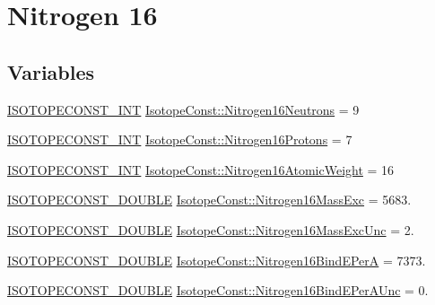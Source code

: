 \hypertarget{group___isotope_const-_nitrogen-_n16}{}\section{Nitrogen 16}
\label{group___isotope_const-_nitrogen-_n16}
\subsection*{Variables}
\begin{DoxyCompactItemize}
\item 
\mbox{\hyperlink{group___isotope_const-_macros_ga5f18360b3e99483a35c32d789e62621c}{I\+S\+O\+T\+O\+P\+E\+C\+O\+N\+S\+T\+\_\+\+I\+NT}} \mbox{\hyperlink{group___isotope_const-_nitrogen-_n16_ga45bfa0f05e86acd8a2eba17f4a76db3f}{Isotope\+Const\+::\+Nitrogen16\+Neutrons}} = 9
\item 
\mbox{\hyperlink{group___isotope_const-_macros_ga5f18360b3e99483a35c32d789e62621c}{I\+S\+O\+T\+O\+P\+E\+C\+O\+N\+S\+T\+\_\+\+I\+NT}} \mbox{\hyperlink{group___isotope_const-_nitrogen-_n16_gafdc263f19e692f5c2c4063902e6b3f1c}{Isotope\+Const\+::\+Nitrogen16\+Protons}} = 7
\item 
\mbox{\hyperlink{group___isotope_const-_macros_ga5f18360b3e99483a35c32d789e62621c}{I\+S\+O\+T\+O\+P\+E\+C\+O\+N\+S\+T\+\_\+\+I\+NT}} \mbox{\hyperlink{group___isotope_const-_nitrogen-_n16_ga625ef08cba2be891221f1da5266aeaba}{Isotope\+Const\+::\+Nitrogen16\+Atomic\+Weight}} = 16
\item 
\mbox{\hyperlink{group___isotope_const-_macros_ga8f45a7272ce02c0b4c65c44636ed719a}{I\+S\+O\+T\+O\+P\+E\+C\+O\+N\+S\+T\+\_\+\+D\+O\+U\+B\+LE}} \mbox{\hyperlink{group___isotope_const-_nitrogen-_n16_ga6fcc41e9ec8ed0be4a8ad16f5bf1fb31}{Isotope\+Const\+::\+Nitrogen16\+Mass\+Exc}} = 5683.
\item 
\mbox{\hyperlink{group___isotope_const-_macros_ga8f45a7272ce02c0b4c65c44636ed719a}{I\+S\+O\+T\+O\+P\+E\+C\+O\+N\+S\+T\+\_\+\+D\+O\+U\+B\+LE}} \mbox{\hyperlink{group___isotope_const-_nitrogen-_n16_ga9a78aef1ba1922ec21f2b36e34452d99}{Isotope\+Const\+::\+Nitrogen16\+Mass\+Exc\+Unc}} = 2.
\item 
\mbox{\hyperlink{group___isotope_const-_macros_ga8f45a7272ce02c0b4c65c44636ed719a}{I\+S\+O\+T\+O\+P\+E\+C\+O\+N\+S\+T\+\_\+\+D\+O\+U\+B\+LE}} \mbox{\hyperlink{group___isotope_const-_nitrogen-_n16_ga37ca9de8589e529c94afb98bec5b077b}{Isotope\+Const\+::\+Nitrogen16\+Bind\+E\+PerA}} = 7373.
\item 
\mbox{\hyperlink{group___isotope_const-_macros_ga8f45a7272ce02c0b4c65c44636ed719a}{I\+S\+O\+T\+O\+P\+E\+C\+O\+N\+S\+T\+\_\+\+D\+O\+U\+B\+LE}} \mbox{\hyperlink{group___isotope_const-_nitrogen-_n16_gac904c8ae5f38b65eceb463c7c4f2d98c}{Isotope\+Const\+::\+Nitrogen16\+Bind\+E\+Per\+A\+Unc}} = 0.

\end{DoxyCompactItemize}
